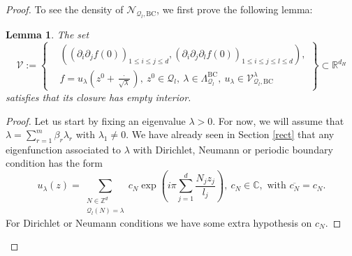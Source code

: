 \documentclass{amsart}
\newtheorem{lemma}[theorem]{Lemma}
\theoremstyle{definition}
\theoremstyle{remark}
\renewcommand\leq\leqslant
\numberwithin{equation}{section}
\theoremstyle{definition}
\theoremstyle{remark}
\begin{document}
\begin{proof}
	To see the density of $\mathcal{N}_{\mathcal{Q}_l,\mathrm{BC}}$, we first prove the following lemma:\begin{lemma}
		The set\begin{equation}
			\mathcal{V}:=\left\{\begin{aligned}&\left(\left(\partial_{i}\partial_{j}f(0)\right)_{1\leq i\leq j\leq d},\left(\partial_{i}\partial_{j}\partial_{l}f(0)\right)_{1\leq i\leq j\leq l\leq d}\right),
				\\& f=u_\lambda\left(z^0+\frac{\cdot}{\sqrt{\lambda}}\right),\ z^0\in\mathcal{Q}_l,\ \lambda \in \Lambda_{\mathcal{Q}_l}^{\mathrm{BC}},\ u_\lambda\in\mathcal{V}_{\mathcal{Q}_l,\mathrm{BC}}^\lambda
			\end{aligned}\right\}\subset\mathbb{R}^{d_H}
		\end{equation} satisfies that its closure has empty interior. 
	\end{lemma}
	\begin{proof}
		Let us start by fixing an eigenvalue $\lambda>0$. For now, we will assume that $\lambda=\sum_{r=1}^m\beta_r\lambda_r$ with $\lambda_1\neq 0$. We have already seen in Section \ref{rect} that any eigenfunction associated to $\lambda$ with Dirichlet, Neumann or periodic boundary condition has the form 
		\begin{equation}
			u_\lambda(z)=\sum_{\substack{N\in\mathbb{Z}^d\\ \mathcal{Q}_l(N)=\lambda}}c_N\exp\left(i\pi\sum_{j=1}^d\frac{N_jz_j}{l_j}\right), \ c_N\in\mathbb{C},\text{ with } \overline{c_N}=c_N.
		\end{equation}For Dirichlet or Neumann conditions we have some extra hypothesis on $c_N$. 
        

\end{proof}
\end{proof}
\end{document}
